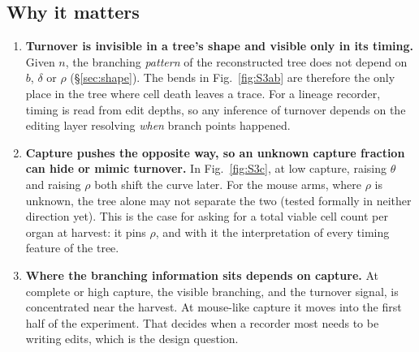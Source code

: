 \documentclass[11pt]{article}
\newcommand{\bdrate}{b}          %
\newcommand{\dthrate}{\delta}    %
\newcommand{\turn}{\theta}       %
\newcommand{\capt}{\rho}         %
\begin{document}
\subsection{Why it matters}

\begin{enumerate}
  \item \textbf{Turnover is invisible in a tree's shape and visible only in its timing.} Given $n$,
        the branching \emph{pattern} of the reconstructed tree does not depend on $\bdrate$,
        $\dthrate$ or $\capt$ (\S\ref{sec:shape}). The bends in Fig.~\ref{fig:S3ab} are therefore
        the only place in the tree where cell death leaves a trace. For a lineage recorder, timing
        is read from edit depths, so any inference of turnover depends on the editing layer
        resolving \emph{when} branch points happened.
  \item \textbf{Capture pushes the opposite way, so an unknown capture fraction can hide or mimic
        turnover.} In Fig.~\ref{fig:S3c}, at low capture, raising $\turn$ and raising $\capt$
        both shift the curve later. For the mouse arms, where $\capt$ is unknown, the tree alone
        may not separate the two (tested formally in neither direction yet). This is the case for
        asking for a total viable cell count per organ at harvest: it pins $\capt$, and with it the
        interpretation of every timing feature of the tree.
  \item \textbf{Where the branching information sits depends on capture.} At complete or high
        capture, the visible branching, and the turnover signal, is concentrated near the harvest.
        At mouse-like capture it moves into the first half of the experiment. That decides when a
        recorder most needs to be writing edits, which is the design question.
\end{enumerate}

\clearpage


\clearpage

\end{document}
